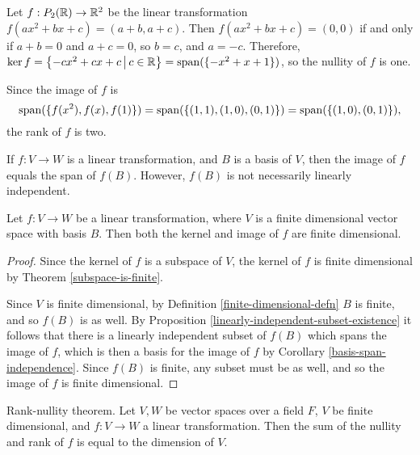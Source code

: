 \begin{exmp}
    Let $f: P_2(\mathbb{R}) \to \mathbb{R}^2$ be the linear transformation $f(ax^2 + bx + c) = (a + b, a + c)$. Then $f(ax^2 + bx + c) = (0, 0)$ if and only if $a + b = 0$ and $a + c = 0$, so $b = c$, and $a = -c$. Therefore, $\ker f = \left\{-cx^2 + cx + c \,\middle|\, c \in \mathbb{R} \right\} = \operatorname{span}(\{-x^2 + x + 1\})$, so the nullity of $f$ is one.

    Since the image of $f$ is \[\operatorname{span}(\{f(x^2), f(x), f(1)\}) = \operatorname{span}(\{(1, 1), (1, 0), (0, 1)\}) = \operatorname{span}(\{(1, 0), (0, 1)\}),\] the rank of $f$ is two.
\end{exmp}

\begin{rmk}
    If $f: V \to W$ is a linear transformation, and $B$ is a basis of $V$, then the image of $f$ equals the span of $f(B)$. However, $f(B)$ is not necessarily linearly independent.
\end{rmk}

\begin{prop}\label{kernel-image-are-finite}
    Let $f: V \to W$ be a linear transformation, where $V$ is a finite dimensional vector space with basis $B$. Then both the kernel and image of $f$ are finite dimensional.
\end{prop}

\begin{proof}
    Since the kernel of $f$ is a subspace of $V$, the kernel of $f$ is finite dimensional by Theorem \ref{subspace-is-finite}.

    Since $V$ is finite dimensional, by Definition \ref{finite-dimensional-defn} $B$ is finite, and so $f(B)$ is as well. By Proposition \ref{linearly-independent-subset-existence} it follows that there is a linearly independent subset of $f(B)$ which spans the image of $f$, which is then a basis for the image of $f$ by Corollary \ref{basis-span-independence}. Since $f(B)$ is finite, any subset must be as well, and so the image of $f$ is finite dimensional.
\end{proof}

\begin{thm}\label{rank-nullity}
    Rank-nullity theorem. Let $V, W$ be vector spaces over a field $F$, $V$ be finite dimensional, and $f: V \to W$ a linear transformation. Then the sum of the nullity and rank of $f$ is equal to the dimension of $V$.
\end{thm}

